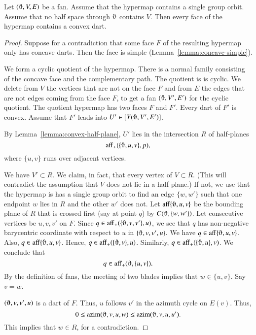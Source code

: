 \begin{lemma}  
Let $(\orgn,V,E)$ be a fan. Assume that the hypermap contains a single
group orbit.   
Assume that no half space
through $\orgn$ contains $V$.  Then every face of the hypermap contains
a convex dart.
\end{lemma}

\begin{proof}
Suppose for a contradiction that 
some face $F$ of the resulting hypermap only has concave darts.  Then
the face is simple (Lemma~\ref{lemma:concave-simple}).  

We form a cyclic quotient of the hypermap.
There
is a normal family consisting of the concave face and the complementary path.
The quotient is is cyclic.  We delete from $V$ the vertices that are not on the face $F$ and from $E$ the edges that are not edges coming from the face $F$,
to get a fan $(\orgn,V',E')$ for the cyclic quotient.
The quotient hypermap has two faces $F$ and $F'$.  Every dart
of $F'$ is convex.  Assume that $F'$ leads into $U'\in[Y(\orgn,V',E')]$.

By Lemma~\ref{lemma:convex-half-plane}, $U'$
lies in the intersection $R$ of half-planes
$$
\op{aff}_+(\{\orgn,u,v\},p),
$$
where $\{u,v\}$ runs over adjacent vertices.  


We have $V'\subset R$.  We claim, in fact, that
every vertex of $V\subset R$.
(This will contradict the assumption that $V$ does not lie in a half plane.)
If not, we use that the hypermap is has a single group orbit 
to find an edge $\{w,w'\}$ such
that one endpoint $w$ lies in $R$ and the other $w'$ does not.  
Let $\op{aff}\{\orgn,u,v\}$ be the bounding plane of $R$ that 
is crossed first (say at point $q$) by
$C(\orgn,\{w,w'\})$.
Let consecutive vertices be $u,v,v'$ on $F$.  Since
$q\in \op{aff}_+(\{\orgn,v,v'\},u)$, 
we see that $q$ has non-negative barycentric
coordinate with respect to $u$ in $\{\orgn,v,v',u\}$.  
We have $q\in \op{aff}\{\orgn,u,v\}$. Also, $q\in\op{aff}\{\orgn,u,v\}$.
Hence, $q\in \op{aff}_+(\{\orgn,v\},u)$.  Similarly,
$q\in\op{aff}_+(\{\orgn,u\},v)$.
We conclude that 
  $$q\in \op{aff}_+(\orgn,\{u,v\}).$$
By the definition of fans, the meeting of two
blades implies that $w\in\{u,v\}$. Say $v=w$.

$(\orgn,v,v',u)$ is a dart of $F$.  Thus, $u$ follows $v'$ in the azimuth cycle on $E(v)$.  Thus,
  $$0 \le \op{azim}(\orgn,v,u,w) \le \op{azim}(\orgn,v,u,u').$$
This implies that $w\in R$, for a contradiction.
\end{proof}

